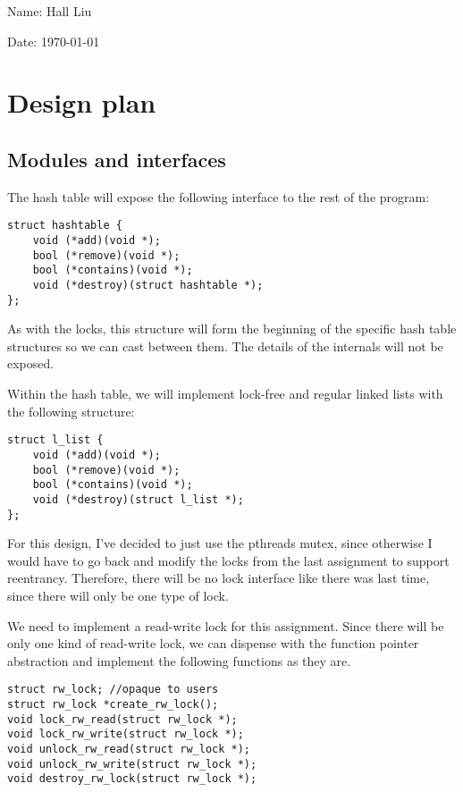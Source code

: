 \documentclass{article}
\begin{document}
Name: Hall Liu

Date: \today 
\vspace{1.5cm}

\section*{Design plan}
\subsection*{Modules and interfaces}
The hash table will expose the following interface to the rest of the program:
\begin{verbatim}
struct hashtable {
    void (*add)(void *);
    bool (*remove)(void *);
    bool (*contains)(void *);
    void (*destroy)(struct hashtable *);
};
\end{verbatim}
As with the locks, this structure will form the beginning of the specific hash table structures so we can cast between them. The details of the internals will not be exposed.

Within the hash table, we will implement lock-free and regular linked lists with the following structure:
\begin{verbatim}
struct l_list {
    void (*add)(void *);
    bool (*remove)(void *);
    bool (*contains)(void *);
    void (*destroy)(struct l_list *);
};
\end{verbatim}
For this design, I've decided to just use the pthreads mutex, since otherwise I would have to go back and modify the locks from the last assignment to support reentrancy. Therefore, there will be no lock interface like there was last time, since there will only be one type of lock.

We need to implement a read-write lock for this assignment. Since there will be only one kind of read-write lock, we can dispense with the function pointer abstraction and implement the following functions as they are.
\begin{verbatim}
struct rw_lock; //opaque to users
struct rw_lock *create_rw_lock();
void lock_rw_read(struct rw_lock *);
void lock_rw_write(struct rw_lock *);
void unlock_rw_read(struct rw_lock *);
void unlock_rw_write(struct rw_lock *);
void destroy_rw_lock(struct rw_lock *);
\end{verbatim}
\end{document}

